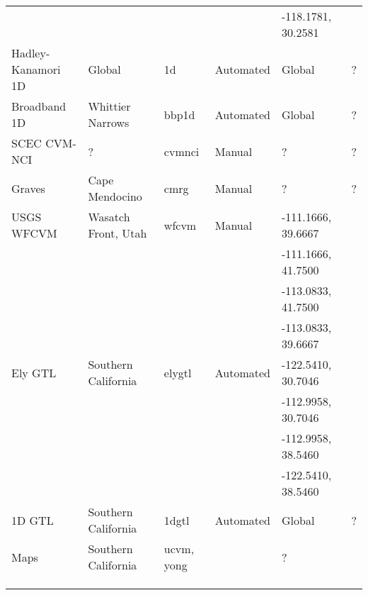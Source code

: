\begin{table*}[ht!]
\begin{tabular}[]{lllllp{1.25in}}
                   &                       &               &              & -118.1781, 30.2581 &                              \\
Hadley-Kanamori 1D & Global                & 1d            &  Automated   & Global             & ?                            \\
Broadband 1D       & Whittier Narrows      & bbp1d         &  Automated   & Global             & ?                            \\
SCEC CVM-NCI       & ?                     & cvmnci        &  Manual      & ?                  & ?                            \\
Graves             & Cape Mendocino        & cmrg          &  Manual      & ?                  & ?                            \\
USGS WFCVM         & Wasatch Front, Utah   & wfcvm         &  Manual      & -111.1666, 39.6667 & \citet{Magistrale_2006_Tech} \\
                   &                       &               &              & -111.1666, 41.7500 &                              \\
                   &                       &               &              & -113.0833, 41.7500 &                              \\
                   &                       &               &              & -113.0833, 39.6667 &                              \\
\hline
Ely GTL            & Southern California   & elygtl        &  Automated   & -122.5410, 30.7046 & \citet{Ely_2010_AGU}         \\
                   &                       &               &              & -112.9958, 30.7046 &                              \\
                   &                       &               &              & -112.9958, 38.5460 &                              \\
                   &                       &               &              & -122.5410, 38.5460 &                              \\
1D GTL             & Southern California   & 1dgtl         &  Automated   & Global             & ?                            \\
\vsthirty{} Maps   & Southern California   & ucvm, yong    &              & ?                  & \citet{Wills_2006_BSSA}      \\
                   &                       &               &              &                    & \citet{Wald_2007_BSSA}       \\
                   &                       &               &              &                    & \citet{Yong_2012_BSSA}       \\
\hline
\\
\end{tabular}
\label{tab:cvms}
\end{table*}


